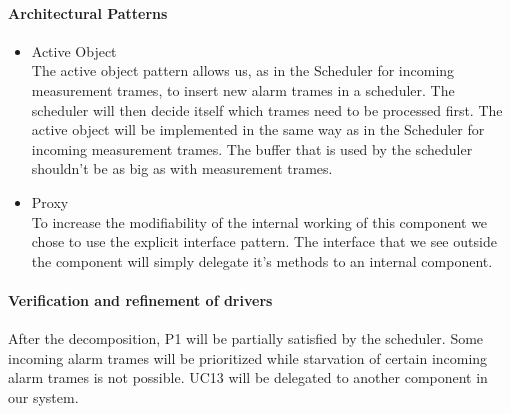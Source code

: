 \paragraph{Architectural Patterns}
\begin{itemize}
	\item Active Object\\
	The active object pattern allows us, as in the Scheduler for incoming measurement trames,
		to insert new alarm trames in a scheduler. The scheduler will then decide
		itself which trames need to be processed first. The active object will be
		implemented in the same way as in the Scheduler for incoming measurement trames.
		The buffer that is used by the scheduler shouldn't be as big as with measurement trames.
	\item Proxy \\
	To increase the modifiability of the internal working of this component we chose
		to use the explicit interface pattern. The interface that we see outside the
		component will simply delegate it's methods to an internal component.
\end{itemize}


\paragraph{Verification and refinement of drivers}
After the decomposition, P1 will be partially satisfied by the scheduler.
Some incoming alarm trames will be prioritized while starvation of certain
	incoming alarm trames is not possible.
UC13 will be delegated to another component in our system.